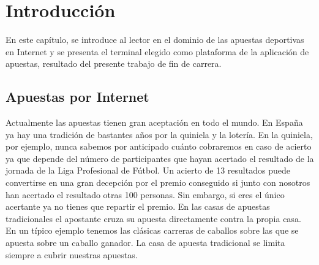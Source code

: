 \chapter{Introducción}
\label{ch:intro}

En este capítulo, se introduce al lector en el dominio de las apuestas deportivas en Internet y se presenta el terminal elegido como plataforma de la aplicación de apuestas, resultado del presente trabajo de fin de carrera.

\section{Apuestas por Internet}





Actualmente las apuestas tienen gran aceptación en todo el mundo. En España ya hay una tradición de bastantes años por la quiniela y la lotería. En la quiniela, por ejemplo, nunca sabemos por anticipado cuánto cobraremos en caso de acierto ya que depende del número de participantes que hayan acertado el resultado de la jornada de la Liga Profesional de Fútbol. Un acierto de 13 resultados puede convertirse en una gran decepción por el premio conseguido si junto con nosotros han acertado el resultado otras 100 personas. Sin embargo, si eres el único acertante ya no tienes que repartir el premio. En las casas de apuestas tradicionales el apostante cruza su apuesta directamente contra la propia casa. En un típico ejemplo tenemos las clásicas carreras de caballos sobre las que se apuesta sobre un caballo ganador. La casa de apuesta tradicional se limita siempre a cubrir nuestras apuestas. 


